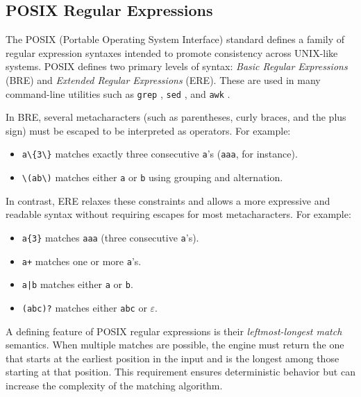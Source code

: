 \subsection{POSIX Regular Expressions}

The POSIX (Portable Operating System Interface) standard defines a family of regular expression syntaxes intended to promote consistency across UNIX-like systems. POSIX defines two primary levels of syntax: \textit{Basic Regular Expressions} (BRE) and \textit{Extended Regular Expressions} (ERE). These are used in many command-line utilities such as \texttt{grep} \cite{sw_grep}, \texttt{sed} \cite{sw_sed}, and \texttt{awk} \cite{sw_gawk}.

In BRE, several metacharacters (such as parentheses, curly braces, and the plus sign) must be escaped to be interpreted as operators. For example:
\begin{itemize}
	\item \texttt{a\textbackslash\{3\textbackslash\}} matches exactly three consecutive \texttt{a}'s (\texttt{aaa}, for instance).
	\item \texttt{\textbackslash(a\textbar b\textbackslash)} matches either \texttt{a} or \texttt{b} using grouping and alternation.
\end{itemize}

In contrast, ERE relaxes these constraints and allows a more expressive and readable syntax without requiring escapes for most metacharacters. For example:
\begin{itemize}
	\item \texttt{a\{3\}} matches \texttt{aaa} (three consecutive \texttt{a}'s).
	\item \texttt{a+} matches one or more \texttt{a}'s.
	\item \texttt{a|b} matches either \texttt{a} or \texttt{b}.
	\item \texttt{(abc)?} matches either \texttt{abc} or $\varepsilon$.
\end{itemize}

A defining feature of POSIX regular expressions is their \textit{leftmost-longest match} semantics. When multiple matches are possible, the engine must return the one that starts at the earliest position in the input and is the longest among those starting at that position. This requirement ensures deterministic behavior but can increase the complexity of the matching algorithm. \cite{regex_opengroup}


